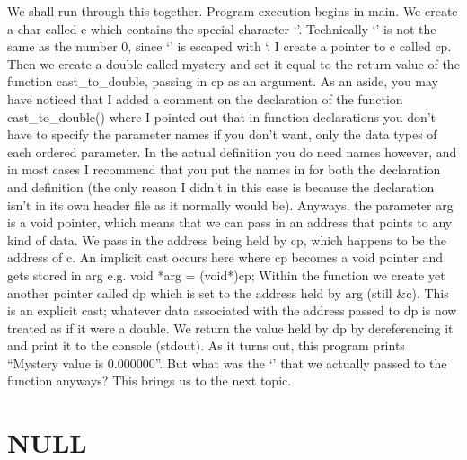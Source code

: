 \documentclass{article}
\begin{document}
We shall run through this together. Program execution begins in main. We create a char called c which
contains the special character ‘\0’. Technically ‘\0’ is not the same as the number 0, since ‘\0’ is escaped
with ‘\’. I create a pointer to c called cp. Then we create a double called mystery and set it equal to the
return value of the function cast_to_double, passing in cp as an argument. As an aside, you may have noticed
that I added a comment on the declaration of the function cast_to_double() where I pointed out that in
function declarations you don’t have to specify the parameter names if you don’t want, only the data types of
each ordered parameter. In the actual definition you do need names however, and in most cases I recommend
that you put the names in for both the declaration and definition (the only reason I didn’t in this case is
because the declaration isn’t in its own header file as it normally would be). Anyways, the parameter arg is
a void pointer, which means that we can pass in an address that points to any kind of data. We pass in the
address being held by cp, which happens to be the address of c. An implicit cast occurs here where cp becomes
a void pointer and gets stored in arg e.g. void *arg = (void*)cp; Within the function we create yet another
pointer called dp which is set to the address held by arg (still &c). This is an explicit cast; whatever data
associated with the address passed to dp is now treated as if it were a double. We return the value held by
dp by dereferencing it and print it to the console (stdout). As it turns out, this program prints “Mystery
value is 0.000000”. But what was the ‘\0’ that we actually passed to the function anyways? This brings us to
the next topic.

\section{NULL}
\end{document}
